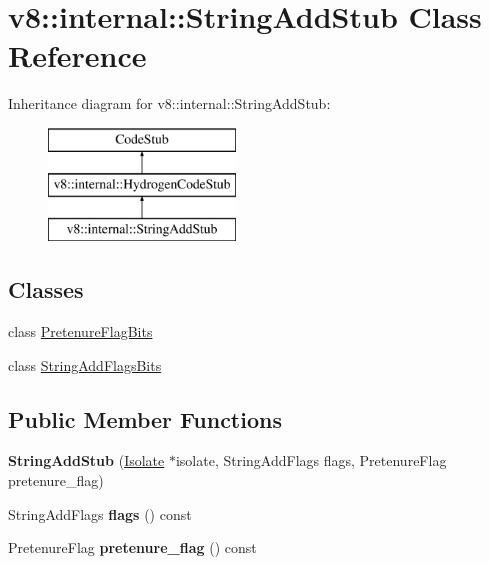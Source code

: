 \hypertarget{classv8_1_1internal_1_1_string_add_stub}{}\section{v8\+:\+:internal\+:\+:String\+Add\+Stub Class Reference}
\label{classv8_1_1internal_1_1_string_add_stub}
Inheritance diagram for v8\+:\+:internal\+:\+:String\+Add\+Stub\+:\begin{figure}[H]
\begin{center}
\leavevmode
\includegraphics[height=3.000000cm]{classv8_1_1internal_1_1_string_add_stub}
\end{center}
\end{figure}
\subsection*{Classes}
\begin{DoxyCompactItemize}
\item 
class \hyperlink{classv8_1_1internal_1_1_string_add_stub_1_1_pretenure_flag_bits}{Pretenure\+Flag\+Bits}
\item 
class \hyperlink{classv8_1_1internal_1_1_string_add_stub_1_1_string_add_flags_bits}{String\+Add\+Flags\+Bits}
\end{DoxyCompactItemize}
\subsection*{Public Member Functions}
\begin{DoxyCompactItemize}
\item 
{\bfseries String\+Add\+Stub} (\hyperlink{classv8_1_1internal_1_1_isolate}{Isolate} $\ast$isolate, String\+Add\+Flags flags, Pretenure\+Flag pretenure\+\_\+flag)\hypertarget{classv8_1_1internal_1_1_string_add_stub_a14f1f4e8bceda445b3a094c87fe3b253}{}\label{classv8_1_1internal_1_1_string_add_stub_a14f1f4e8bceda445b3a094c87fe3b253}

\item 
String\+Add\+Flags {\bfseries flags} () const \hypertarget{classv8_1_1internal_1_1_string_add_stub_a77484dfa81812aaa35233c8a307d7ee8}{}\label{classv8_1_1internal_1_1_string_add_stub_a77484dfa81812aaa35233c8a307d7ee8}

\item 
Pretenure\+Flag {\bfseries pretenure\+\_\+flag} () const \hypertarget{classv8_1_1internal_1_1_string_add_stub_a7d0da92fd60e231635f92f8330d6e02f}{}\label{classv8_1_1internal_1_1_string_add_stub_a7d0da92fd60e231635f92f8330d6e02f}

\end{DoxyCompactItemize}
